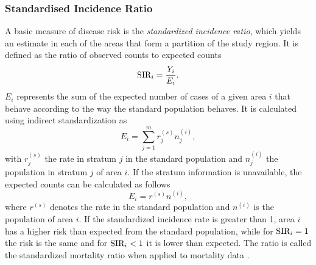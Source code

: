 \subsubsection{Standardised Incidence Ratio}\label{sec:sir}
A basic measure of disease risk is the \textit{standardized incidence ratio}, which yields an estimate in each of the areas that form a partition of the study region. It is defined as the ratio of observed counts to expected counts
\begin{equation}\label{eq:sir}
    \hbox{SIR}_i = \frac{Y_i}{E_i}.
\end{equation}
$E_i$ represents the sum of the expected number of cases of a given area $i$ that behave according to the way the standard population behaves. It is calculated using indirect standardization as
\begin{equation}
    E_i=\sum_{j=1}^mr_j^{(s)}n_j^{(i)},
\end{equation}
with $r_j^{(s)}$ the rate in stratum $j$ in the standard population and $n_j^{(i)}$ the population in stratum $j$ of area $i$. If the stratum information is unavailable, the expected counts can be calculated as follows
\begin{equation*}
    E_i = r^{(s)}n^{(i)},
\end{equation*}
where $r^{(s)}$ denotes the rate in the standard population and $n^{(i)}$ is the population of area $i$. If the standardized incidence rate is greater than 1, area $i$ has a higher risk than expected from the standard population, while for $\hbox{SIR}_i = 1$ the risk is the same and for $\hbox{SIR}_i < 1$ it is lower than expected. The ratio is called the standardized mortality ratio when applied to mortality data \autocite[][]{moraga2019geospatial}.
